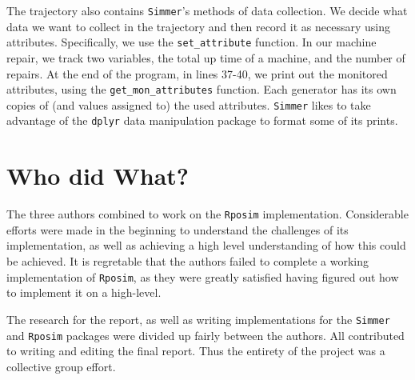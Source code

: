 \documentclass[a4paper, 11pt]{article} %
\begin{document}
The trajectory also contains \texttt{Simmer}'s methods of data collection. We decide what data we want to collect in the trajectory and then record it as necessary using attributes. Specifically, we use the \texttt{set\_attribute} function. In our machine repair, we track two variables, the total up time of a machine, and the number of repairs. At the end of the program, in lines 37-40, we print out the monitored attributes, using the \texttt{get\_mon\_attributes} function. Each generator has its own copies of (and values assigned to) the used attributes. \texttt{Simmer} likes to take advantage of the \texttt{dplyr} data manipulation package to format some of its prints. \pagebreak


\pagebreak


\section{Who did What?}

The three authors combined to work on the \texttt{Rposim} implementation. Considerable efforts were made in the beginning to understand the challenges of its implementation, as well as achieving a high level understanding of how this could be achieved. It is regretable that the authors failed to complete a working implementation of \texttt{Rposim}, as they were greatly satisfied having figured out how to implement it on a high-level.

The research for the report, as well as writing implementations for the \texttt{Simmer} and \texttt{Rposim} packages were divided up fairly between the authors. All contributed to writing and editing the final report. Thus the entirety of the project was a collective group effort.

\end{document}
